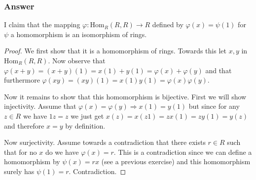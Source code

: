 \documentclass[12pt]{article}
\begin{document}
\subsubsection{Answer}
I claim that the mapping $\varphi:  \mathrm{Hom}_R(R,R) \to R$ defined by $\varphi(x) = \psi(1) $ for $\psi$ a homomorphism  is an isomorphism of rings.
\begin{proof}
We first show that it is a homomorphism  of rings. Towards this let $x, y$ in $\mathrm{Hom}_R(R,R)$. Now observe that $\varphi(x + y) = (x+y)(1) = x(1) + y(1)=\varphi(x) + \varphi(y)$ and that furthermore $\varphi(x y) = (xy)(1) =   x(1) y(1) = \varphi(x)\varphi(y) $. 

Now it remains to show that this homomorphism is bijective. First we will show injectivity. Assume that $\varphi(x)=\varphi(y) \Rightarrow x(1) = y(1)$ but since for any $z \in R $ we have $1 z = z$ we just get $x(z)=x(z 1) = z x(1) = z y(1) = y(z)$ and therefore $x = y$ by definition.

Now surjectivity. Assume towards a contradiction that there exists $r \in R $ such that for no $x$ do we have $\varphi(x) = r$. This is a contradiction since we can define a homomorphism by $\psi(x) = r x $ (see a previous exercise) and this homomorphism surely has $\psi(1) = r$. Contradiction.
\end{proof}
\end{document}

